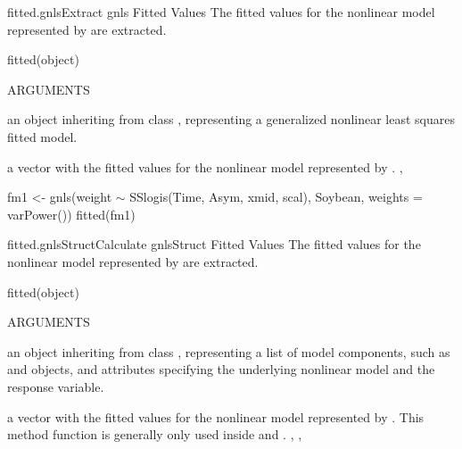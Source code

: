 \documentclass[pdftex]{article} \usepackage{url,graphicx}
\renewcommand{\Twiddle}{\mbox{\(\sim\)}}
\begin{document}
\begin{Helpfile}{fitted.gnls}{Extract gnls Fitted Values}
The fitted values for the nonlinear model represented by 
are extracted.
\begin{Example}
fitted(object)
\end{Example}
\begin{Argument}{ARGUMENTS}
\item[\Co{object:}]
an object inheriting from class , representing
a generalized nonlinear least squares fitted model.
\end{Argument}
a vector with the fitted values for the nonlinear model represented by
.
, 
\need 15pt
\vspace{-16pt}
\begin{Example}
fm1 <- gnls(weight {\Twiddle} SSlogis(Time, Asym, xmid, scal), Soybean,
            weights = varPower())
fitted(fm1)
\end{Example}
\end{Helpfile}
\begin{Helpfile}{fitted.gnlsStruct}{Calculate gnlsStruct Fitted Values}
The fitted values for the nonlinear model represented by 
are extracted.
\begin{Example}
fitted(object)
\end{Example}
\begin{Argument}{ARGUMENTS}
\item[\Co{object:}]
an object inheriting from class ,
representing a list of model components, such as
 and  objects, and attributes
specifying the underlying nonlinear model and the response variable.
\end{Argument}
a vector with the fitted values for the nonlinear model represented by
.
 This method function is generally only used inside  and 
.
, ,
\end{Helpfile}
\end{document}
